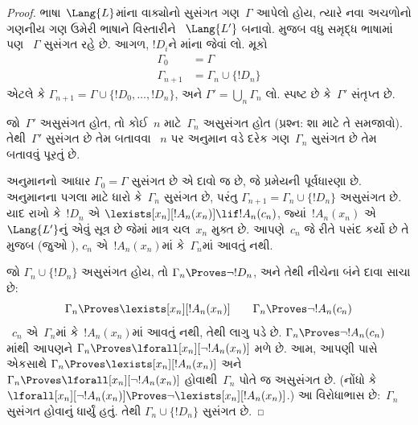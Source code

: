 \begin{proof}
ભાષા~$\Lang{L}$માંના વાક્યોનો સુસંગત ગણ~$\Gamma$ આપેલો હોય, ત્યારે
નવા અચળોનો ગણનીય ગણ ઉમેરી ભાષાને વિસ્તારીને
~$\Lang{L'}$ બનાવો.  મુજબ વધુ સમૃદ્ધ ભાષામાં પણ
~$\Gamma$ સુસંગત રહે છે. આગળ, $!D_i$ને માંના
જેવાં લો. મૂકો
\begin{align*}
\Gamma_0 & = \Gamma \\
\Gamma_{n+1} & = \Gamma_n \cup \{!D_n \}
\end{align*}
એટલે કે $\Gamma_{n+1}=\Gamma\cup\{!D_0,\dots,!D_n\}$, અને
$\Gamma'=\bigcup_{n}\Gamma_n$ લો. સ્પષ્ટ છે કે~$\Gamma'$ સંતૃપ્ત છે.

જો~$\Gamma'$ અસુસંગત હોત, તો કોઈ~$n$ માટે~$\Gamma_n$ અસુસંગત હોત
(પ્રશ્ન: શા માટે તે સમજાવો). તેથી~$\Gamma'$ સુસંગત છે તેમ બતાવવા
~$n$ પર અનુમાન વડે દરેક ગણ~$\Gamma_n$ સુસંગત છે તેમ બતાવવું પૂરતું છે.

અનુમાનનો આધાર $\Gamma_0=\Gamma$ સુસંગત છે એ દાવો જ છે, જે પ્રમેયની
પૂર્વધારણા છે. અનુમાનના પગલા માટે ધારો કે~$\Gamma_{n}$ સુસંગત છે, પરંતુ
$\Gamma_{n+1}=\Gamma_n\cup\{!D_n\}$ અસુસંગત છે. યાદ રાખો કે~$!D_n$ એ
$\lexists[x_{n}][!A_{n}(x_n)] \lif !A_{n}(c_{n})$,
જ્યાં~$!A_n(x_n)$ એ~$\Lang{L'}$નું એવું સૂત્ર છે જેમાં માત્ર
ચલ~$x_n$ મુક્ત છે. આપણે~$c_n$ જે રીતે પસંદ કર્યો છે તે મુજબ (જુઓ
), $c_n$ એ~$!A_n(x_n)$માં કે~$\Gamma_n$માં
આવતું નથી.

જો $\Gamma_n\cup\{!D_n\}$ અસુસંગત હોય, તો $\Gamma_n\Proves\lnot
!D_n$, અને તેથી નીચેના બંને દાવા સાચા છે:
\[
\Gamma_n \Proves \lexists[x_n][!A_n(x_n)]
\qquad
\Gamma_n \Proves \lnot !A_n(c_n)
\]
~$c_n$ એ~$\Gamma_n$માં કે~$!A_n(x_n)$માં આવતું નથી, તેથી
લાગુ પડે છે.
$\Gamma_n \Proves \lnot !A_n(c_n)$
માંથી આપણને
$\Gamma_n \Proves \lforall[x_n][\lnot !A_n(x_n)]$
મળે છે. આમ, આપણી પાસે એકસાથે
$\Gamma_n \Proves \lexists[x_n][!A_n(x_n)]$ અને
$\Gamma_n \Proves \lforall[x_n][\lnot !A_n(x_n)]$
હોવાથી~$\Gamma_n$ પોતે જ અસુસંગત છે.
(નોંધો કે
$\lforall[x_n][\lnot !A_n(x_n)] \Proves
  \lnot\lexists[x_n][!A_n(x_n)]$.)
આ વિરોધાભાસ છે:~$\Gamma_n$ સુસંગત હોવાનું ધાર્યું હતું. તેથી
$\Gamma_n\cup\{!D_n\}$ સુસંગત છે.
\end{proof}


